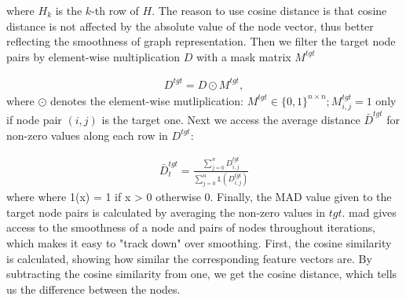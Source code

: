 where $H_{k}$ is the $k$-th row of $H$. The reason to use cosine distance is that cosine distance is not affected by the absolute value of the node vector,
thus better reflecting the smoothness of graph representation. Then we filter the target node pairs by element-wise multiplication $D$ with a mask matrix $M^{tgt}$

\begin{align*}
    D^{tgt} = D \odot M^{tgt},
\end{align*}
where $\odot$ denotes the element-wise mutliplication: $M^{tgt} \in \{0,1\}^{n \times n}; M_{i,j}^{tgt}= 1$ only if node pair $(i,j)$ is the target one.
Next we access the average distance $\bar{D}^{tgt}$ for non-zero values along each row in $D^{tgt}:$

\begin{align*}
    \bar{D}_{t}^{tgt} = \frac{\sum_{j=0}^{n}D_{i,j}^{tgt}}{\sum_{j=0}^{n}\mathds{1}(D_{i,j}^{tgt})}
\end{align*}
where where 1(x) = 1 if x > 0 otherwise 0. Finally, the MAD value given to the target node pairs is calculated by averaging the non-zero values in $\mathit{tgt}$.
\Ac{mad} gives access to the smoothness of a node and pairs of nodes throughout iterations, which makes it easy to "track down" over smoothing.
First, the cosine similarity is calculated, showing how similar the corresponding feature vectors are.
By subtracting the cosine similarity from one, we get the cosine distance, which tells us the difference between the nodes.
